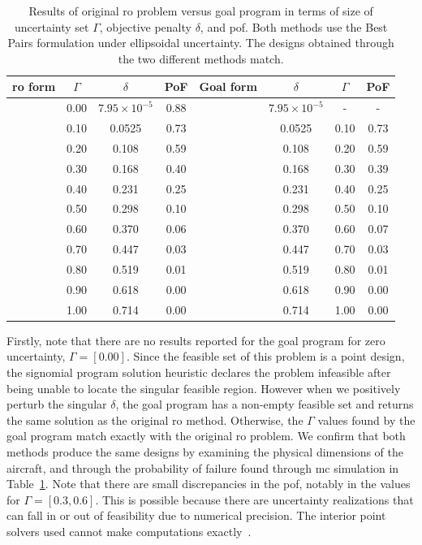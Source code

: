 \begin{table}
\begin{center}
\caption{\label{tab:deltaVsGamma} Results of original \gls{ro} problem versus goal program in terms
of size of uncertainty set $\Gamma$, objective penalty $\delta$, and \gls{pof}. Both methods
use the Best Pairs formulation under ellipsoidal uncertainty. The designs obtained through
the two different methods match.}
\begin{tabular}{c c c c c c c c}
\hline
 \gls{ro} form & $\Gamma$ & $\delta$ & PoF & Goal form & $\delta$ & $\Gamma$ & PoF\\
\hline
& 0.00 & $7.95 \times 10^{-5}$ & 0.88 & & $7.95 \times 10^{-5}$ & - & - \\
& 0.10 & 0.0525 & 0.73 & & 0.0525 & 0.10 & 0.73 \\
& 0.20 & 0.108 & 0.59 & & 0.108 & 0.20 & 0.59 \\
& 0.30 & 0.168 & 0.40 & & 0.168 & 0.30 & 0.39 \\
& 0.40 & 0.231 & 0.25 & & 0.231 & 0.40 & 0.25 \\
& 0.50 & 0.298 & 0.10 & & 0.298 & 0.50 & 0.10 \\
& 0.60 & 0.370 & 0.06 & & 0.370 & 0.60 & 0.07 \\
& 0.70 & 0.447 & 0.03 & & 0.447 & 0.70 & 0.03 \\
& 0.80 & 0.519 & 0.01 & & 0.519 & 0.80 & 0.01 \\
& 0.90 & 0.618 & 0.00 & & 0.618 & 0.90 & 0.00 \\
& 1.00 & 0.714 & 0.00 & & 0.714 & 1.00 & 0.00 \\
\end{tabular}
\end{center}
\end{table}

Firstly, note that there are no results reported for the goal program
for zero uncertainty, $\Gamma = [0.00]$.
Since the feasible set of this problem is a point design, the signomial program
solution heuristic declares the problem infeasible after being
unable to locate the singular feasible region. However when we positively perturb
the singular $\delta$, the goal program has a non-empty feasible set and
returns the same solution as the original \gls{ro} method.
Otherwise, the $\Gamma$ values found by the goal program match exactly
with the original \gls{ro} problem. We confirm that both methods produce
the same designs by examining the physical dimensions of the aircraft, and through the probability
of failure found through \gls{mc} simulation in Table~\ref{tab:deltaVsGamma}.
Note that there are small discrepancies
in the \gls{pof}, notably in the values for $\Gamma = [0.3, 0.6]$. This is
possible because there are uncertainty realizations that can fall
in or out of feasibility due to numerical precision. The interior point solvers
used cannot make computations exactly~\cite{Nesterov1994}.

